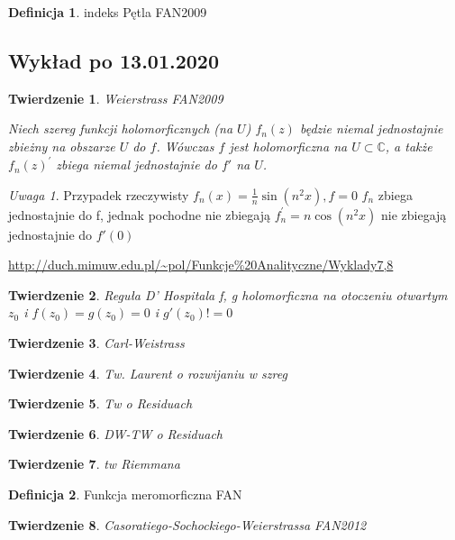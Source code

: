 \documentclass{article}
\theoremstyle{plain}
\newtheorem*{theorem}{Twierdzenie}
\theoremstyle{definition}
\newtheorem*{definition}{Definicja}
\theoremstyle{remark}
\newtheorem*{remark}{Uwaga}
\begin{document}
\begin{definition}{indeks Pętla FAN2009}

\end{definition}


\subsection{Wykład po 13.01.2020}

\begin{theorem}{Weierstrass FAN2009}

  Niech szereg funkcji holomorficznych (na $U$) $ f_n(z) $ będzie niemal jednostajnie zbieżny na obszarze $U$ do $f$. Wówczas $f$ jest holomorficzna na $U \subset \mathbb{C}$, a także $f_n(z)^{'}$ zbiega niemal jednostajnie do $f'$ na $U$.
  
  
\end{theorem}

\begin{remark}{Przypadek rzeczywisty}
$f_n(x) = \frac{1}{n}\sin(n^{2}x), f=0$ $f_n$ zbiega jednostajnie do f, jednak pochodne nie zbiegają $f_n^{'} = n \cos(n^2x)$ nie zbiegają jednostajnie do $f'(0)$
\end{remark}

\url{http://duch.mimuw.edu.pl/~pol/Funkcje%20Analityczne/Wyklady7,8}

\begin{theorem}{Reguła D' Hospitala}
f, g holomorficzna na otoczeniu otwartym $z_0$ i $f(z_0) = g(z_0) = 0$ i $g'(z_0) != 0$
\end{theorem}

\begin{theorem}{Carl-Weistrass}

\end{theorem}

\begin{theorem}{Tw. Laurent  o rozwijaniu w szreg}

\end{theorem}


\begin{theorem}{Tw o Residuach}

\end{theorem}

\begin{theorem}{DW-TW o Residuach}

\end{theorem}

\begin{theorem}{tw Riemmana}

\end{theorem}

\begin{definition}{Funkcja meromorficzna FAN}

\end{definition}


\begin{theorem}{Casoratiego-Sochockiego-Weierstrassa FAN2012}

\end{theorem}
\end{document}
